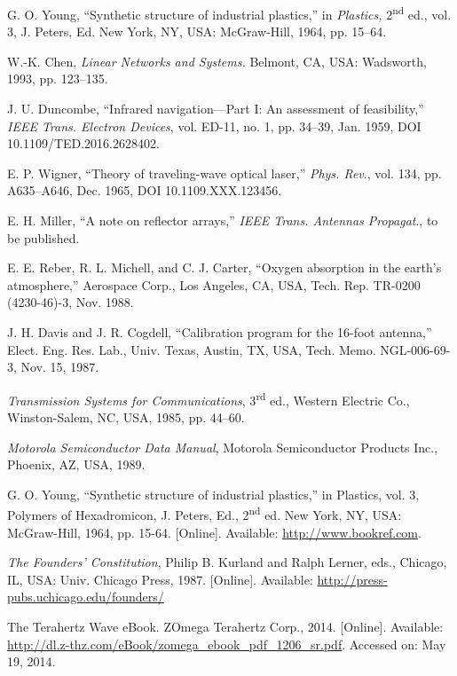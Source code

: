 \documentclass{ieeeaccess}
\begin{document}
\begin{thebibliography}{00}

     G. O. Young, ``Synthetic structure of industrial plastics,'' in \emph{Plastics,} 2\textsuperscript{nd} ed., vol. 3, J. Peters, Ed. New York, NY, USA: McGraw-Hill, 1964, pp. 15--64.

     W.-K. Chen, \emph{Linear Networks and Systems.} Belmont, CA, USA: Wadsworth, 1993, pp. 123--135.

     J. U. Duncombe, ``Infrared navigation---Part I: An assessment of feasibility,'' \emph{IEEE Trans. Electron Devices}, vol. ED-11, no. 1, pp. 34--39, Jan. 1959, DOI 10.1109/TED.2016.2628402.

     E. P. Wigner, ``Theory of traveling-wave optical laser,'' \emph{Phys. Rev}., vol. 134, pp. A635--A646, Dec. 1965, DOI 10.1109.XXX.123456.

     E. H. Miller, ``A note on reflector arrays,'' \emph{IEEE Trans. Antennas Propagat}., to be published.

     E. E. Reber, R. L. Michell, and C. J. Carter, ``Oxygen absorption in the earth's atmosphere,'' Aerospace Corp., Los Angeles, CA, USA, Tech. Rep. TR-0200 (4230-46)-3, Nov. 1988.

     J. H. Davis and J. R. Cogdell, ``Calibration program for the 16-foot antenna,'' Elect. Eng. Res. Lab., Univ. Texas, Austin, TX, USA, Tech. Memo. NGL-006-69-3, Nov. 15, 1987.

     \emph{Transmission Systems for Communications}, 3\textsuperscript{rd} ed., Western Electric Co., Winston-Salem, NC, USA, 1985, pp. 44--60.

     \emph{Motorola Semiconductor Data Manual}, Motorola Semiconductor Products Inc., Phoenix, AZ, USA, 1989.

     G. O. Young, ``Synthetic structure of industrial
    plastics,'' in Plastics, vol. 3, Polymers of Hexadromicon, J. Peters,
    Ed., 2\textsuperscript{nd} ed. New York, NY, USA: McGraw-Hill, 1964, pp. 15-64.
    [Online]. Available:
    \underline{http://www.bookref.com}.

     \emph{The Founders' Constitution}, Philip B. Kurland
    and Ralph Lerner, eds., Chicago, IL, USA: Univ. Chicago Press, 1987.
        [Online]. Available: \underline{http://press-pubs.uchicago.edu/founders/}

     The Terahertz Wave eBook. ZOmega Terahertz Corp., 2014.
        [Online]. Available:
    \underline{http://dl.z-thz.com/eBook/zomega\_ebook\_pdf\_1206\_sr.pdf}. Accessed on: May 19, 2014.


\end{thebibliography}
\end{document}
